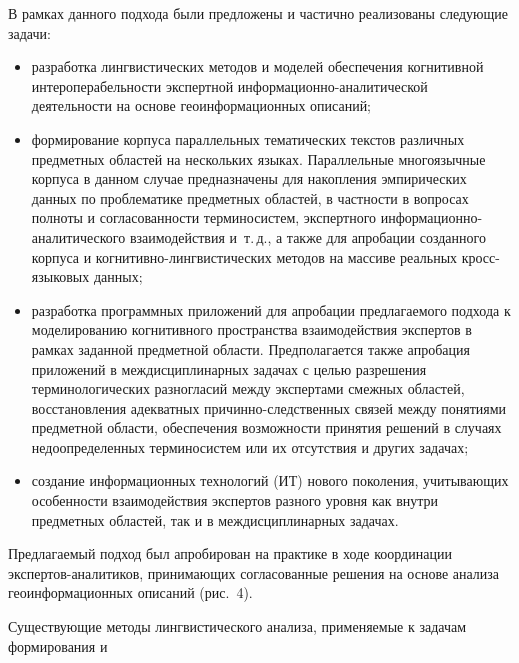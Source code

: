 \begin{multicols}{2}
     В рамках данного подхода были предложены и частично реализованы 
следующие задачи: 
     \begin{itemize}
\item разработка лингвистических методов и моделей обеспечения 
когнитивной интероперабельности экспертной 
ин\-фор\-ма\-ци\-он\-но-ана\-ли\-ти\-че\-ской деятельности на основе 
геоинформационных описаний;
\item формирование корпуса параллельных тематических текстов 
различных предметных областей на нескольких языках. Параллельные 
многоязычные корпуса в данном случае предназначены для накопления 
эмпирических данных по проблематике предметных областей, в 
частности в вопросах полноты и согласованности терминосистем, 
экспертного ин\-фор\-ма\-ци\-он\-но-ана\-ли\-ти\-че\-ско\-го 
взаимодействия и~т.\,д., а так\-же для апробации созданного корпуса и 
ког\-ни\-тив\-но-линг\-ви\-сти\-че\-ских методов на массиве реальных 
кросс-язы\-ко\-вых данных;
\item разработка программных приложений для апробации 
предлагаемого подхода к моделированию когнитивного пространства 
взаимодействия экспертов в рамках заданной предметной области. 
Предполагается также апробация приложений в междисциплинарных 
задачах с целью разрешения терминологических разногласий между 
экспертами смежных областей, восстановления адекватных 
при\-чин\-но-след\-ст\-вен\-ных связей между понятиями предметной 
области, обеспечения возможности принятия решений в случаях 
недоопределенных терминосистем или их отсутствия и других задачах;
\item создание информационных технологий (ИТ) нового поколения, учитывающих особенности 
взаимодействия экспертов разного уровня как внутри предметных 
областей, так и в междисциплинарных задачах.
\end{itemize}

     Предлагаемый подход был апробирован на практике в ходе 
координации экс\-пер\-тов-ана\-ли\-ти\-ков, принимающих согласованные 
решения на основе анализа геоинформационных описаний (рис.~4).
     
     Существующие методы лингвистического анализа, применяемые к 
задачам формирования и\linebreak\vspace*{-12pt}

\pagebreak

\end{multicols}

            \begin{figure} %
      \vspace*{1pt}
 \begin{center}
 \mbox{%
 \epsfxsize=161.258mm
 }
 \end{center}
 \vspace*{-6pt}
\end{figure}


